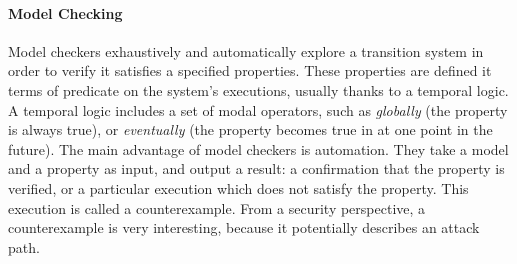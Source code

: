 \paragraph{Model Checking}
%
Model checkers exhaustively and automatically explore a transition system in
order to verify it satisfies a specified properties.
%
These properties are defined it terms of predicate on the system's executions,
usually thanks to a temporal logic.
%
A temporal logic includes a set of modal operators, such as \emph{globally} (the
property is always true), or \emph{eventually} (the property becomes true in at
one point in the future).
%
The main advantage of model checkers is automation.
%
They take a model and a property as input, and output a result: a confirmation
that the property is verified, or a particular execution which does not satisfy
the property.
%
This execution is called a counterexample.
%
From a security perspective, a counterexample is very interesting, because it
potentially describes an attack path.

